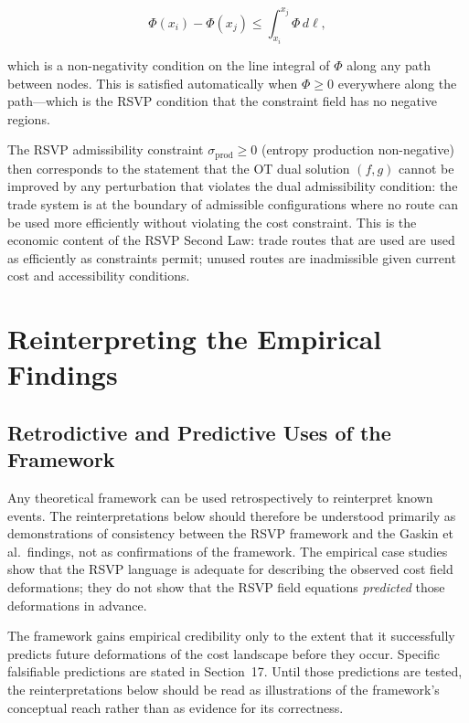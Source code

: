 \documentclass[12pt]{article}
\newcommand{\sigprod}{\sigma_{\mathrm{prod}}}
\begin{document}
\begin{equation}
\Phi(x_i) - \Phi(x_j) \leq \int_{x_i}^{x_j} \Phi\, d\ell,
\label{eq:phi_admissibility}
\end{equation}

which is a non-negativity condition on the line integral of $\Phi$ along any path between nodes. This is satisfied automatically when $\Phi \geq 0$ everywhere along the path---which is the RSVP condition that the constraint field has no negative regions.

The RSVP admissibility constraint $\sigprod \geq 0$ (entropy production non-negative) then corresponds to the statement that the OT dual solution $(f, g)$ cannot be improved by any perturbation that violates the dual admissibility condition: the trade system is at the boundary of admissible configurations where no route can be used more efficiently without violating the cost constraint. This is the economic content of the RSVP Second Law: trade routes that are used are used as efficiently as constraints permit; unused routes are inadmissible given current cost and accessibility conditions.

\section{Reinterpreting the Empirical Findings}

\subsection{Retrodictive and Predictive Uses of the Framework}

Any theoretical framework can be used retrospectively to reinterpret known events. The reinterpretations below should therefore be understood primarily as demonstrations of consistency between the RSVP framework and the Gaskin et al.\ findings, not as confirmations of the framework. The empirical case studies show that the RSVP language is adequate for describing the observed cost field deformations; they do not show that the RSVP field equations \emph{predicted} those deformations in advance.

The framework gains empirical credibility only to the extent that it successfully predicts future deformations of the cost landscape before they occur. Specific falsifiable predictions are stated in Section~17. Until those predictions are tested, the reinterpretations below should be read as illustrations of the framework's conceptual reach rather than as evidence for its correctness.
\end{document}
